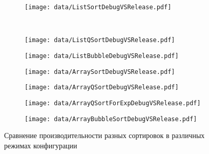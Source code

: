 \begin{figure}[H]
	\centering
	\begin{subfigure}[b]{0.40\textwidth}
       \centering
	   \texttt{[image: data/ListSortDebugVSRelease.pdf]}
	   \label{fig:ListSortDebugVSRelease}
	\end{subfigure}~
	\begin{subfigure}[b]{0.40\textwidth}
       \centering
	   \texttt{[image: data/ListQSortDebugVSRelease.pdf]}
	   \label{fig:ListQSortDebugVSRelease}
	\end{subfigure}
	\begin{subfigure}[b]{0.40\textwidth}
       \centering
	   \texttt{[image: data/ListBubbleDebugVSRelease.pdf]}
	   \label{fig:ListBubbleDebugVSRelease}
	\end{subfigure}
	\begin{subfigure}[b]{0.40\textwidth}
       \centering
	   \texttt{[image: data/ArraySortDebugVSRelease.pdf]}
	   \label{fig:ArraySortDebugVSRelease}
	\end{subfigure}
	\begin{subfigure}[b]{0.40\textwidth}
       \centering
	   \texttt{[image: data/ArrayQSortDebugVSRelease.pdf]}
	   \label{fig:ArrayQSortDebugVSRelease}
	\end{subfigure}
	\begin{subfigure}[b]{0.40\textwidth}
       \centering
	   \texttt{[image: data/ArrayQSortForExpDebugVSRelease.pdf]}
	   \label{fig:ArrayQSortForExpDebugVSRelease}
	\end{subfigure}
	\begin{subfigure}[b]{0.40\textwidth}
       \centering
	   \texttt{[image: data/ArrayBubbleSortDebugVSRelease.pdf]}
	   \label{fig:ArrayBubbleSortDebugVSRelease}
	\end{subfigure}
	\caption{Сравнение производительности разных сортировок в различных режимах конфигурации}
	\label{fig:DebugVSRelease}
\end{figure}

